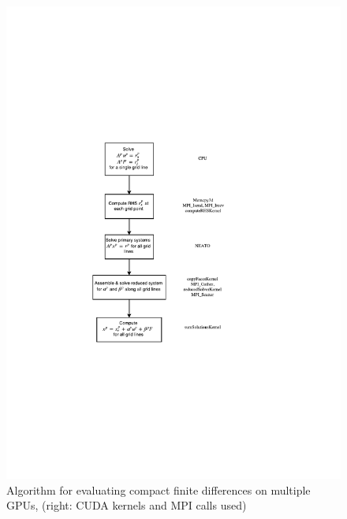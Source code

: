 \begin{figure}
\begin{center}
\includegraphics[trim={0 7cm 0 7cm},clip,width=500pt]{img/compact-algorithm.pdf}
\centering
\caption{Algorithm for evaluating compact finite differences on multiple GPUs,
(right: CUDA kernels and MPI calls used)}
\label{fig:compact-algorithm}
\end{center}
\end{figure}

